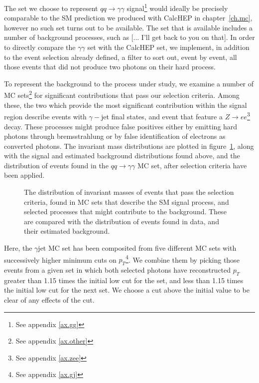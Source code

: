 The set we choose to represent $qq\rightarrow\gamma\gamma$ signal\footnote{See appendix \ref{ax.gg}} would ideally be precisely comparable to the SM prediction we produced with CalcHEP in chapter~\ref{ch.mc}, however no such set turns out to be available. The set that is available includes a number of background processes, such as [... I'll get back to you on that]. In order to directly compare the \atlas{} $\gamma\gamma$ set with the CalcHEP set, we implement, in addition to the event selection already defined, a filter to sort out, event by event, all those events that did not produce two photons on their hard process.

To represent the background to the process under study, we examine a number of MC sets\footnote{See appendix \ref{ax.other}} for significant contributions that pass our selection criteria. Among these, the two which provide the most significant contribution within the signal region describe events with $\gamma-$jet final states, and event that feature a $Z\rightarrow ee$\footnote{See appendix \ref{ax.zee}} decay. These processes might produce false positives either by emitting hard photons through bremsstrahlung or by false identification of electrons as converted photons. The invariant mass distributions are plotted in figure~\ref{mclist}, along with the signal and estimated background distributions found above, and the distribution of events found in the \atlas{} $qq\rightarrow\gamma\gamma$ MC set, after selection criteria have been applied.

\begin{figure}[htp]
\begin{minipage}[b]{.69\textwidth}
\begin{infilsf} \tiny

\end{infilsf}
\end{minipage}
\begin{minipage}[b]{.3\textwidth}
\caption{The distribution of invariant masses of events that pass the selection criteria, found in \atlas{} MC sets that describe the SM signal process, and selected processes that might contribute to the background. These are compared with the distribution of events found in data, and their estimated background.}\label{mclist}
\end{minipage}
\end{figure}

Here, the $\gamma$jet MC set has been composited from five different MC sets with successively higher minimum cuts on $p_T$\footnote{See appendix \ref{ax.gj}}. We combine them by picking those events from a given set in which both selected photons have reconstructed $p_T$ greater than 1.15 times the initial low cut for the set, and less than 1.15 times the initial low cut for the next set. We choose a cut above the initial value to be clear of any effects of the cut.

